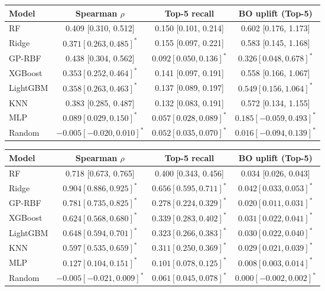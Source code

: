 \begin{tabular}{lccc}
\toprule
Model & Spearman $\rho$ & Top-5 recall & BO uplift (Top-5) \\
\midrule
RF & 0.409 [0.310, 0.512] & 0.150 [0.101, 0.214] & 0.602 [0.176, 1.173] \\
Ridge & $0.371 [0.263, 0.485]^{*}$ & 0.155 [0.097, 0.221] & 0.583 [0.145, 1.168] \\
GP-RBF & 0.438 [0.304, 0.562] & $0.092 [0.050, 0.136]^{*}$ & $0.326 [0.048, 0.678]^{*}$ \\
XGBoost & $0.353 [0.252, 0.464]^{*}$ & 0.141 [0.097, 0.191] & 0.558 [0.166, 1.067] \\
LightGBM & $0.358 [0.263, 0.463]^{*}$ & 0.137 [0.089, 0.197] & $0.549 [0.156, 1.064]^{*}$ \\
KNN & 0.383 [0.285, 0.487] & 0.132 [0.083, 0.191] & 0.572 [0.134, 1.155] \\
MLP & $0.089 [0.029, 0.150]^{*}$ & $0.057 [0.028, 0.089]^{*}$ & $0.185 [-0.059, 0.493]^{*}$ \\
Random & $-0.005 [-0.020, 0.010]^{*}$ & $0.052 [0.035, 0.070]^{*}$ & $0.016 [-0.094, 0.139]^{*}$ \\
\bottomrule
\end{tabular}

\begin{tabular}{lccc}
\toprule
Model & Spearman $\rho$ & Top-5 recall & BO uplift (Top-5) \\
\midrule
RF & 0.718 [0.673, 0.765] & 0.400 [0.343, 0.456] & 0.034 [0.026, 0.043] \\
Ridge & $0.904 [0.886, 0.925]^{*}$ & $0.656 [0.595, 0.711]^{*}$ & $0.042 [0.033, 0.053]^{*}$ \\
GP-RBF & $0.781 [0.735, 0.825]^{*}$ & $0.278 [0.224, 0.329]^{*}$ & $0.020 [0.011, 0.031]^{*}$ \\
XGBoost & $0.624 [0.568, 0.680]^{*}$ & $0.339 [0.283, 0.402]^{*}$ & $0.031 [0.022, 0.041]^{*}$ \\
LightGBM & $0.648 [0.594, 0.701]^{*}$ & $0.323 [0.266, 0.383]^{*}$ & $0.030 [0.022, 0.040]^{*}$ \\
KNN & $0.597 [0.535, 0.659]^{*}$ & $0.311 [0.250, 0.369]^{*}$ & $0.029 [0.021, 0.039]^{*}$ \\
MLP & $0.127 [0.104, 0.151]^{*}$ & $0.101 [0.078, 0.125]^{*}$ & $0.008 [0.003, 0.014]^{*}$ \\
Random & $-0.005 [-0.021, 0.009]^{*}$ & $0.061 [0.045, 0.078]^{*}$ & $0.000 [-0.002, 0.002]^{*}$ \\
\bottomrule
\end{tabular}
